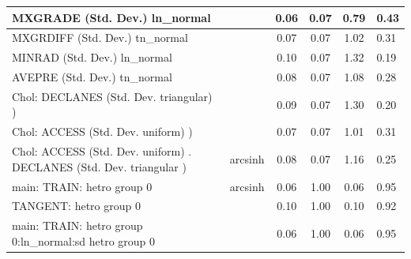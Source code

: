\begin{table}
\begin{center}
\begin{tabular}{|l|l|c|c|c|l|}
			\hline
			MXGRADE (Std. Dev.) ln_normal &  & 0.06 & 0.07 & 0.79 & 0.43 \\
			\hline
			MXGRDIFF (Std. Dev.) tn_normal &  & 0.07 & 0.07 & 1.02 & 0.31 \\
			\hline
			MINRAD (Std. Dev.) ln_normal &  & 0.10 & 0.07 & 1.32 & 0.19 \\
			\hline
			AVEPRE (Std. Dev.) tn_normal &  & 0.08 & 0.07 & 1.08 & 0.28 \\
			\hline
			 Chol: DECLANES (Std. Dev. triangular) ) &  & 0.09 & 0.07 & 1.30 & 0.20 \\
			\hline
			 Chol: ACCESS (Std. Dev. uniform) ) &  & 0.07 & 0.07 & 1.01 & 0.31 \\
			\hline
			 Chol: ACCESS (Std. Dev. uniform) . DECLANES (Std. Dev.   triangular ) & arcsinh & 0.08 & 0.07 & 1.16 & 0.25 \\
			\hline
			main: TRAIN: hetro group 0 & arcsinh & 0.06 & 1.00 & 0.06 & 0.95 \\
			\hline
			TANGENT: hetro group 0 &  & 0.10 & 1.00 & 0.10 & 0.92 \\
			\hline
			main: TRAIN: hetro group 0:ln_normal:sd  hetro group 0 &  & 0.06 & 1.00 & 0.06 & 0.95 \\
			\hline
		\end{tabular}
	\end{center}
\end{table}